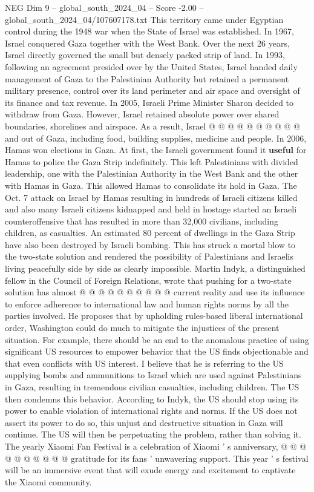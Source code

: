 \begin{textsample}{NEG Dim 9 – global\_south\_2024\_04 – Score -2.00 – global\_south\_2024\_04/107607178.txt}
This territory came under Egyptian control during the 1948 war when the State of Israel was established.
In 1967, Israel conquered Gaza together with the West Bank.
Over the next 26 years, Israel directly governed the small but densely packed strip of land.
In 1993, following an agreement presided over by the United States, Israel handed daily management of Gaza to the Palestinian Authority but retained a permanent military presence, control over its land perimeter and air space and oversight of its finance and tax revenue.
In 2005, Israeli Prime Minister Sharon decided to withdraw from Gaza.
However, Israel retained absolute power over shared boundaries, shorelines and airspace.
As a result, Israel @ @ @ @ @ @ @ @ @ @ and out of Gaza, including food, building supplies, medicine and people.
In 2006, Hamas won elections in Gaza.
At first, the Israeli government found it \textbf{useful} for Hamas to police the Gaza Strip indefinitely.
This left Palestinians with divided leadership, one with the Palestinian Authority in the West Bank and the other with Hamas in Gaza.
This allowed Hamas to consolidate its hold in Gaza.
The Oct. 7 attack on Israel by Hamas resulting in hundreds of Israeli citizens killed and also many Israeli citizens kidnapped and held in hostage started an Israeli counteroffensive that has resulted in more than 32,000 civilians, including children, as casualties.
An estimated 80 percent of dwellings in the Gaza Strip have also been destroyed by Israeli bombing.
This has struck a mortal blow to the two-state solution and rendered the possibility of Palestinians and Israelis living peacefully side by side as clearly impossible.
Martin Indyk, a distinguished fellow in the Council of Foreign Relations, wrote that pushing for a two-state solution has almost @ @ @ @ @ @ @ @ @ @ current reality and use its influence to enforce adherence to international law and human rights norms by all the parties involved.
He proposes that by upholding rules-based liberal international order, Washington could do much to mitigate the injustices of the present situation.
For example, there should be an end to the anomalous practice of using significant US resources to empower behavior that the US finds objectionable and that even conflicts with US interest.
I believe that he is referring to the US supplying bombs and ammunitions to Israel which are used against Palestinians in Gaza, resulting in tremendous civilian casualties, including children.
The US then condemns this behavior.
According to Indyk, the US should stop using its power to enable violation of international rights and norms.
If the US does not assert its power to do so, this unjust and destructive situation in Gaza will continue.
The US will then be perpetuating the problem, rather than solving it.
The yearly Xiaomi Fan Festival is a celebration of Xiaomi ' s anniversary, @ @ @ @ @ @ @ @ @ @ gratitude for its fans ' unwavering support.
This year ' s festival will be an immersive event that will exude energy and excitement to captivate the Xiaomi community.

\end{textsample}
